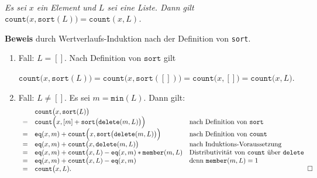 \begin{Proposition} \hspace*{\fill} \\[0.1cm]
{\em
  Es sei $x$ ein Element und $L$ sei eine Liste.  Dann gilt \\[0.1cm]
  \hspace*{1.3cm} $\mathtt{count}\bigl(x, \mathtt{sort}(L)\bigr) = \mathtt{count}(x, L)$.
}
\end{Proposition}

\noindent
\textbf{Beweis} durch Wertverlaufs-Induktion nach der Definition von \texttt{sort}.
\begin{enumerate}
\item Fall: $L=[]$.  Nach Definition von $\mathtt{sort}$ gilt 

     \hspace*{1.3cm} 
     $\mathtt{count}\bigl(x, \mathtt{sort}(L)\bigr) = \mathtt{count}\bigl(x, \mathtt{sort}([])\bigr) = \mathtt{count}\bigl(x,[]\bigr) = \mathtt{count}\bigl(x,L\bigr)$.
\item Fall: $L \not= []$.  Es sei $m = \mathtt{min}(L)$. Dann gilt:
     \[ 
     \begin{array}[b]{cll}
        & \mathtt{count}\bigl(x, \mathtt{sort}(L)\bigr) \\
      = & \mathtt{count}\Bigl(x, [m] + \mathtt{sort}\bigl(\mathtt{delete}(m,L)\bigr)\Bigr) &
         \mbox{nach Definition von \texttt{sort}} \\
      = & \mathtt{eq}(x,m) + \mathtt{count}\Bigl(x, \mathtt{sort}\bigl(\mathtt{delete}(m,L)\bigr)\Bigr) &
         \mbox{nach Definition von \texttt{count}} \\
      = & \mathtt{eq}(x,m) + \mathtt{count}\bigl(x, \mathtt{delete}(m,L)\bigr) &
         \mbox{nach Induktions-Voraussetzung} \\
      = & \mathtt{eq}(x,m) + \mathtt{count}\bigl(x, L) - \mathtt{eq}(x,m)*\mathtt{member}(m,L) &
         \mbox{Distributivit\"at von \texttt{count} \"uber \texttt{delete}} \\
      = & \mathtt{eq}(x,m) + \mathtt{count}\bigl(x, L) - \mathtt{eq}(x,m) &
         \mbox{denn $\mathtt{member}(m,L) = 1$} \\
      = & \mathtt{count}\bigl(x, L).
     \end{array}\hspace*{\fill} \Box
     \]
\end{enumerate}

